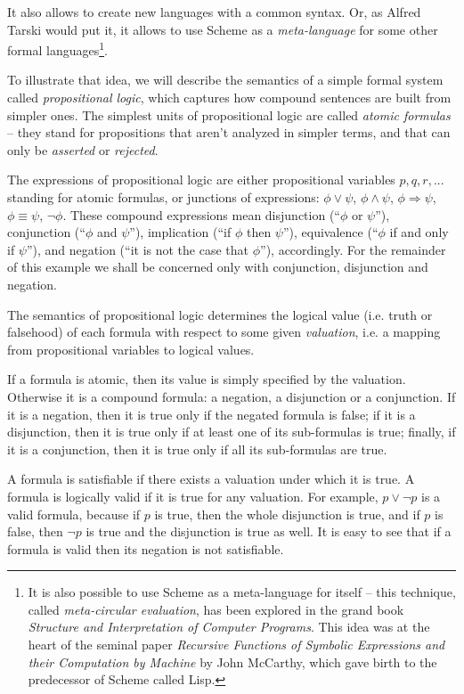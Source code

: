 It also allows to create new languages with a common syntax.
Or, as Alfred Tarski would put it, it allows to use Scheme
as a \textit{meta-language} for some other formal languages\footnote{
It is also possible to use Scheme as a meta-language for itself
-- this technique, called \textit{meta-circular evaluation},
has been explored in the grand book \textit{Structure and
Interpretation of Computer Programs}\cite{SICP}. This idea was
at the heart of the seminal paper \textit{Recursive Functions
of Symbolic Expressions and their Computation by Machine}
by John McCarthy\cite{McCarthy1960}, which gave birth to
the predecessor of Scheme called Lisp.}.

To illustrate that idea, we will describe the semantics of
a simple formal system called \textit{propositional logic}, which
captures how compound sentences are built from simpler ones.
The simplest units of propositional logic are called
\textit{atomic formulas} -- they stand for propositions
that aren't analyzed in simpler terms, and that can only
be \textit{asserted} or \textit{rejected}.

The expressions of propositional logic are either propositional
variables $p,q,r,...$ standing for atomic
formulas, or junctions of expressions: $\phi \vee \psi$,
$\phi \wedge \psi$, $\phi \Rightarrow \psi$, $\phi \equiv \psi$,
$\neg \phi$. These compound expressions mean disjunction (``$\phi$ or
$\psi$''), conjunction (``$\phi$ and $\psi$''), implication
(``if $\phi$ then $\psi$''), equivalence (``$\phi$ if and only
if $\psi$''), and negation (``it is not the case that $\phi$''),
accordingly. For the remainder of this example we shall be concerned
only with conjunction, disjunction and negation.

The semantics of propositional logic determines the logical value
(i.e. truth or falsehood) of each formula with respect to some given
\textit{valuation}, i.e. a mapping from propositional variables to
logical values.

If a formula is atomic, then its value is simply specified by the
valuation. Otherwise it is a compound formula: a negation, a disjunction
or a conjunction. If it is a negation, then it is true only if
the negated formula is false; if it is a disjunction, then it
is true only if at least one of its sub-formulas is true; finally,
if it is a conjunction, then it is true only if all its sub-formulas
are true.

A formula is satisfiable if there exists a valuation under which
it is true. A formula is logically valid if it is true for
any valuation. For example, $p \vee \neg p$ is a valid formula,
because if $p$ is true, then the whole disjunction is true, and
if $p$ is false, then $\neg p$ is true and the disjunction is
true as well. It is easy to see that if a formula is valid then
its negation is not satisfiable.

